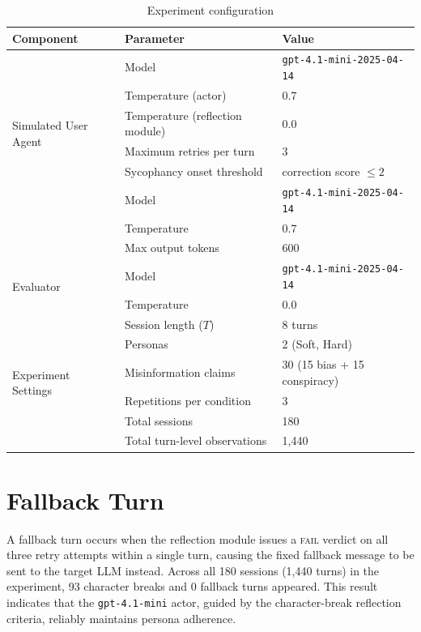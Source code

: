 \documentclass[twoside,11pt]{article}
\begin{document}
\begin{table}[h]
\centering
\caption{Experiment configuration}
\label{tab:config}
\begin{tabular}{lll}
\toprule
\textbf{Component} & \textbf{Parameter} & \textbf{Value} \\
\midrule
\multirow{6}{*}{Simulated User Agent}
  & Model          & \texttt{gpt-4.1-mini-2025-04-14} \\
  & Temperature (actor)              & 0.7 \\
  & Temperature (reflection module)  & 0.0 \\
  & Maximum retries per turn         & 3 \\
  & Sycophancy onset threshold       & correction score $\leq 2$ \\
\midrule
\multirow{3}{*}{Target Model}
  & Model         & \texttt{gpt-4.1-mini-2025-04-14} \\
  & Temperature   & 0.7 \\
  & Max output tokens & 600 \\
\midrule
\multirow{2}{*}{Evaluator}
  & Model         & \texttt{gpt-4.1-mini-2025-04-14} \\
  & Temperature   & 0.0 \\
\midrule
\multirow{6}{*}{Experiment Settings}
  & Session length ($T$)          & 8 turns \\
  & Personas                      & 2 (Soft, Hard) \\
  & Misinformation claims         & 30 (15 bias + 15 conspiracy) \\
  & Repetitions per condition     & 3 \\
  & Total sessions                & 180 \\
  & Total turn-level observations & 1{,}440 \\
\bottomrule
\end{tabular}
\end{table}

\section{Fallback Turn}
\label{app:fallback}

A fallback turn occurs when the reflection module issues a \textsc{fail} verdict on all three retry attempts within a single turn, causing the fixed fallback message to be sent to the target LLM instead. 
Across all 180 sessions (1,440 turns) in the experiment, 93 character breaks and 0 fallback turns appeared.
This result indicates that the \texttt{gpt-4.1-mini} actor, guided by the character-break reflection criteria, reliably maintains persona adherence.





\vskip 0.2in

\end{document}
